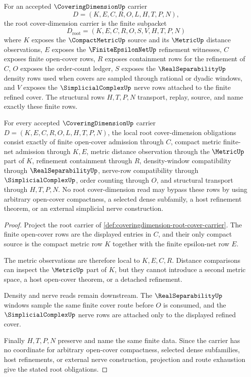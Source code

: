 \begin{definition}
\label{def:coveringdimension-root-cover-carrier}
For an accepted $\CoveringDimensionUp$ carrier
$$
D=(K,E,C,R,O,L,H,T,P,N),
$$
the root cover-dimension carrier is the finite subpacket
$$
D_{\mathrm{root}}=(K,E,C,R,O,S,V,H,T,P,N)
$$
where $K$ exposes the $\CompactMetricUp$ source and its $\MetricUp$ distance observations, $E$ exposes the $\FiniteEpsilonNetUp$ refinement witnesses, $C$ exposes finite open-cover rows, $R$ exposes containment rows for the refinement of $C$, $O$ exposes the order-count ledger, $S$ exposes the $\RealSeparabilityUp$ density rows used when covers are sampled through rational or dyadic windows, and $V$ exposes the $\SimplicialComplexUp$ nerve rows attached to the finite refined cover. The structural rows $H,T,P,N$ transport, replay, source, and name exactly these finite rows.
\end{definition}

\begin{theorem}
\label{thm:coveringdimension-root-cover-namecert-obligations}
For every accepted $\CoveringDimensionUp$ carrier $D=(K,E,C,R,O,L,H,T,P,N)$, the local root cover-dimension obligations consist exactly of finite open-cover admission through $C$, compact metric finite-net admission through $K,E$, metric distance observation through the $\MetricUp$ part of $K$, refinement containment through $R$, density-window compatibility through $\RealSeparabilityUp$, nerve-row compatibility through $\SimplicialComplexUp$, order counting through $O$, and structural transport through $H,T,P,N$. No root cover-dimension read may bypass these rows by using arbitrary open-cover compactness, a selected dense subfamily, a host refinement theorem, or an external simplicial nerve construction.
\end{theorem}
\begin{proof}
Project the root carrier of \autoref{def:coveringdimension-root-cover-carrier}. The finite open-cover rows are the displayed entries in $C$, and their only compact source is the compact metric row $K$ together with the finite epsilon-net row $E$.

The metric observations are therefore local to $K,E,C,R$. Distance comparisons can inspect the $\MetricUp$ part of $K$, but they cannot introduce a second metric space, a host open-cover theorem, or a detached refinement.

Density and nerve reads remain downstream. The $\RealSeparabilityUp$ windows sample the same finite cover route before $O$ is consumed, and the $\SimplicialComplexUp$ nerve rows are attached only to the displayed refined cover.

Finally $H,T,P,N$ preserve and name the same finite data. Since the carrier has no coordinate for arbitrary open-cover compactness, selected dense subfamilies, host refinements, or external nerve construction, projection and route exhaustion give the stated root obligations.
\end{proof}

